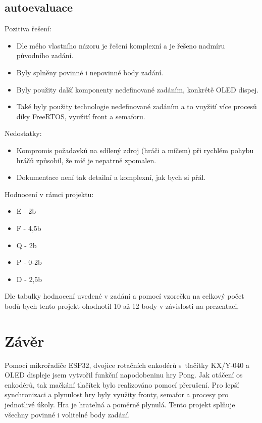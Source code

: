 \documentclass[a4paper,11pt]{article}
\begin{document}
\subsection{autoevaluace}
Pozitiva řešení:
\begin{itemize}
    \item{Dle mého vlastního názoru je řešení komplexní a je řešeno nadmíru původního zadání.}
    \item{Byly splněny povinné i nepovinné body zadání.}
    \item{Byly použity další komponenty nedefinované zadáním, konkrétě OLED dispej.}
    \item{Také byly použity technologie nedefinované zadáním a to vuyžití více procesů díky FreeRTOS, využití front a semaforu.}
\end{itemize}

Nedostatky:
\begin{itemize}
    \item{Kompromis požadavků na sdílený zdroj (hráči a míčem) při rychlém pohybu hráčů způsobil, že míč je nepatrně zpomalen.}
    \item{Dokumentace není tak detailní a komplexní, jak bych si přál.}
\end{itemize}

Hodnocení v rámci projektu:
\begin{itemize}
    \item{E - 2b}
    \item{F - 4,5b}
    \item{Q - 2b}
    \item{P - 0-2b}
    \item{D - 2,5b}
\end{itemize}

Dle tabulky hodnocení uvedené v zadání a pomocí vzorečku na celkový počet bodů bych tento projekt ohodnotil 10 až 12 body v závislosti na prezentaci.

\section{Závěr}
Pomocí mikrořadiče ESP32, dvojice rotačních enkodérů s~tlačítky KX/Y-040 a OLED displeje jsem vytvořil funkční napodobeninu hry Pong.
Jak otáčení os enkodérů, tak mačkání tlačítek bylo realizováno pomocí přerušení. 
Pro lepší synchronizaci a plynulost hry byly využity fronty, semafor a procesy pro jednotlivé úkoly.
Hra je hratelná a poměrně plynulá.
Tento projekt splňuje všechny povinné i volitelné body zadání.
\end{document}
